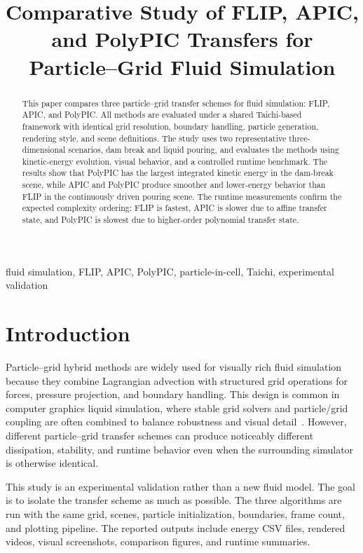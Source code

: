 \documentclass[conference]{IEEEtran}
\title{Comparative Study of FLIP, APIC, and PolyPIC Transfers for Particle--Grid Fluid Simulation}
\author{
\IEEEauthorblockN{Qinzhe Hu \quad Yan Shao \quad Baihan Deng}
}
\begin{document}
\maketitle

\begin{abstract}
This paper compares three particle--grid transfer schemes for fluid simulation: FLIP, APIC, and PolyPIC. All methods are evaluated under a shared Taichi-based framework with identical grid resolution, boundary handling, particle generation, rendering style, and scene definitions. The study uses two representative three-dimensional scenarios, dam break and liquid pouring, and evaluates the methods using kinetic-energy evolution, visual behavior, and a controlled runtime benchmark. The results show that PolyPIC has the largest integrated kinetic energy in the dam-break scene, while APIC and PolyPIC produce smoother and lower-energy behavior than FLIP in the continuously driven pouring scene. The runtime measurements confirm the expected complexity ordering: FLIP is fastest, APIC is slower due to affine transfer state, and PolyPIC is slowest due to higher-order polynomial transfer state.
\end{abstract}

\begin{IEEEkeywords}
fluid simulation, FLIP, APIC, PolyPIC, particle-in-cell, Taichi, experimental validation
\end{IEEEkeywords}

\section{Introduction}

Particle--grid hybrid methods are widely used for visually rich fluid simulation because they combine Lagrangian advection with structured grid operations for forces, pressure projection, and boundary handling. This design is common in computer graphics liquid simulation, where stable grid solvers and particle/grid coupling are often combined to balance robustness and visual detail~\cite{foster2001liquids,bridson}. However, different particle--grid transfer schemes can produce noticeably different dissipation, stability, and runtime behavior even when the surrounding simulator is otherwise identical.

This study is an experimental validation rather than a new fluid model. The goal is to isolate the transfer scheme as much as possible. The three algorithms are run with the same grid, scenes, particle initialization, boundaries, frame count, and plotting pipeline. The reported outputs include energy CSV files, rendered videos, visual screenshots, comparison figures, and runtime summaries.
\end{document}

